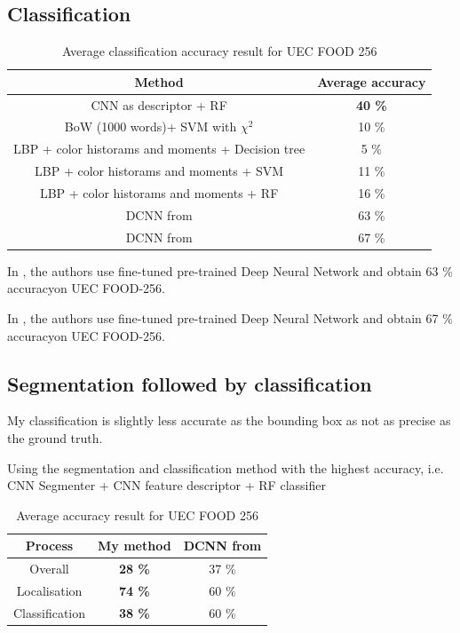 \subsection{Classification}

\begin{table}
    \centering
    \renewcommand{\arraystretch}{1.2}
    \begin{tabulary}{\textwidth}{| c | C|}
        \hline
        Method & Average accuracy \\
        \hline
        CNN as descriptor + RF & \textbf{40 \%} \\ 
        \hline
        BoW (1000 words)+ SVM with $\chi^2$ & 10 \% \\ %
        \hline
        LBP + color historams and moments + Decision tree & 5 \% \\ 
        \hline
        LBP + color historams and moments + SVM & 11 \% \\ %
        \hline
        LBP + color historams and moments + RF & 16 \% \\ %
        \hline
        DCNN from \cite{Bolanos2016} & 63 \%\\
        \hline 
        DCNN from \cite{Yanai2015} & 67 \%\\
        \hline 
    \end{tabulary}
    \caption{Average classification accuracy result for UEC FOOD 256}
\end{table}

In \cite{Bolanos2016}, the authors use fine-tuned pre-trained Deep Neural Network and obtain 63 \% accuracyon UEC FOOD-256.

In \cite{Yanai2015}, the authors use fine-tuned pre-trained Deep Neural Network and obtain 67 \% accuracyon UEC FOOD-256.


\subsection{Segmentation followed by classification}

My classification is slightly less accurate as the bounding box as not as precise as the ground truth.

Using the segmentation and classification method with the highest accuracy, i.e. CNN Segmenter + CNN feature descriptor + RF classifier

\begin{table}
    \centering
    \renewcommand{\arraystretch}{1.2}
    \begin{tabulary}{\textwidth}{| c | C C|}
        \hline
        Process & My method & DCNN from \cite{Bolanos2016} \\
        \hline
        Overall & \textbf{28 \%} & 37 \% \\ 
        \hline
        Localisation &  \textbf{74 \%} & 60 \% \\
        \hline
        Classification &  \textbf{38 \%} & 60 \% \\
        \hline
    \end{tabulary}
    \caption{Average accuracy result for UEC FOOD 256}
\end{table}

